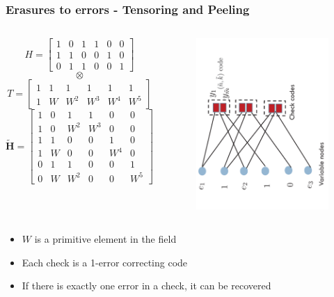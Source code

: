 \documentclass[10pt,xcolor=table]{beamer}
\begin{document}
\begin{frame}\frametitle{Erasures to errors - Tensoring and Peeling}
\begin{columns}
    \small
    \[
    H = \left[
    \begin{array}{ccccccc}
    1&0&1&1&0&0\\
    1&1&0&0&1&0 \\
    0&1&1&0&0&1
    \end{array}
    \right]
    \]
    \[
    \otimes
    \]
    \[
    T = \left[
    \begin{array}{ccccccc}
    1&1&1&1&1&1\\
    1&W&W^2&W^3&W^4&W^5
    \end{array}
    \right]
    \]
    \[
    \mathbf{\tilde{H}} = \left[
    \begin{array}{ccccccc}
    1&0&1&1&0&0\\
    1&0&W^2&W^3&0&0\\
    1&1&0&0&1&0 \\
    1&W&0&0&W^4&0 \\
    0&1&1&0&0&1 \\
    0&W&W^2&0&0&W^5
    \end{array}
    \right]
    \]
    \begin{figure}[t]
    \centering
    \includegraphics[width=2.0in,angle=-90]{./Figures/GLDPC}
    \end{figure}
\end{columns}

\begin{itemize}
\item $W$ is a primitive element in the field
\item Each check is a 1-error correcting code
\item If there is exactly one error in a check, it can be recovered
\end{itemize}

\end{frame}
\end{document}
